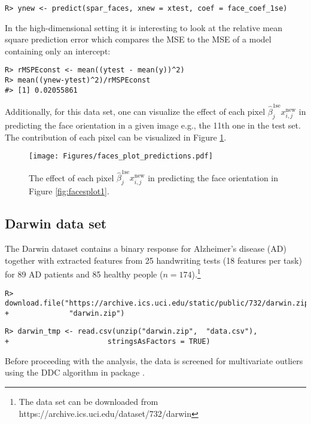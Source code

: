 \documentclass[
  article]{jss}
\begin{document}
\begin{verbatim}
R> ynew <- predict(spar_faces, xnew = xtest, coef = face_coef_1se)
\end{verbatim}

In the high-dimensional setting it is interesting to look at the
relative mean square prediction error which compares the MSE to the MSE
of a model containing only an intercept:

\begin{verbatim}
R> rMSPEconst <- mean((ytest - mean(y))^2) 
R> mean((ynew-ytest)^2)/rMSPEconst
#> [1] 0.02055861
\end{verbatim}

Additionally, for this data set, one can visualize the effect of each
pixel \(\hat\beta^\text{1se}_j x^\text{new}_{i,j}\) in predicting the
face orientation in a given image e.g., the 11th one in the test set.
The contribution of each pixel can be visualized in Figure
\ref{fig:faces_predictions}.

\begin{figure}[t!]
\centering
\texttt{[image: Figures/faces\_plot\_predictions.pdf]}
\caption{The effect of each pixel $\hat\beta^\text{1se}_j x^\text{new}_{i,j}$ in predicting the face orientation in Figure \ref{fig:facesplot1}. \label{fig:faces_predictions}}
\end{figure}

\subsection{Darwin data set}\label{darwin-data-set}

The Darwin dataset \citep{CILIA2022darwin} contains a binary response
for Alzheimer's disease (AD) together with extracted features from 25
handwriting tests (18 features per task) for 89 AD patients and 85
healthy people
(\(n=174\)).\footnote{The data set can be downloaded from  https://archive.ics.uci.edu/dataset/732/darwin}

\begin{verbatim}
R> download.file("https://archive.ics.uci.edu/static/public/732/darwin.zip",
+              "darwin.zip")
\end{verbatim}

\begin{verbatim}
R> darwin_tmp <- read.csv(unzip("darwin.zip",  "data.csv"), 
+                       stringsAsFactors = TRUE)
\end{verbatim}

Before proceeding with the analysis, the data is screened for
multivariate outliers using the DDC algorithm in package 
\citep{rcellwise}.
\end{document}
